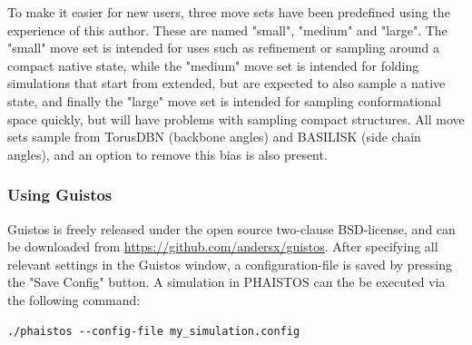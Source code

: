 To make it easier for new users, three move sets have been predefined using the experience of this author.
These are named "small", "medium" and "large".
The "small" move set is intended for uses such as refinement or sampling around a compact native state, 
while the "medium" move set is intended for folding simulations that start from extended, but are expected to also sample a native state, 
and finally the "large" move set is intended for sampling conformational space quickly, but will have problems with sampling compact structures.
All move sets sample from TorusDBN (backbone angles) and BASILISK (side chain angles), and an option to remove this bias is also present.

\subsubsection{Using Guistos}

Guistos is freely released under the open source two-clause BSD-license, and can be downloaded from \url{https://github.com/andersx/guistos}. After specifying all relevant settings in the Guistos window, a configuration-file is saved by pressing the "Save Config" button.
A simulation in PHAISTOS can the be executed via the following command:
\begin{lstlisting}
./phaistos --config-file my_simulation.config
\end{lstlisting}







